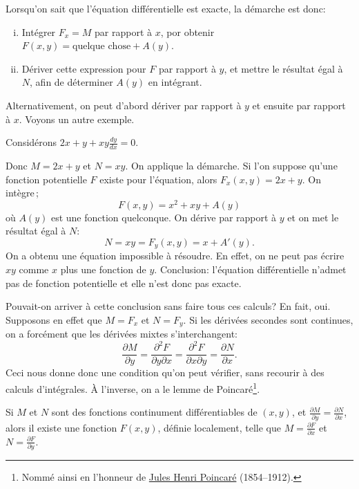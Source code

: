 Lorsqu'on sait que l'équation différentielle est exacte, la démarche est donc:
\begin{enumerate}[(i)]
	\item Intégrer $F_x = M$ par rapport à $x$, por obtenir $F(x,y) = \text{quelque chose} + A(y)$.
	\item Dériver cette expression pour $F$ par rapport à $y$, et mettre le résultat égal à
			$N$, afin de déterminer $A(y)$ en intégrant.
\end{enumerate}
Alternativement, on peut d'abord dériver par rapport à $y$ et ensuite par rapport à $x$.
Voyons un autre exemple.

\begin{example}
	Considérons $2x+y + xy \frac{dy}{dx} = 0$.

	Donc $M = 2x+y$ et $N=xy$.  On applique la démarche.
	Si l'on suppose qu'une fonction potentielle $F$ existe pour l'équation, alors $F_x (x,y) = 2x+y$.
	On intègre\,;
	\begin{equation*}
		F(x,y) = x^2 + xy + A(y)
	\end{equation*}
	où $A(y)$ est une fonction quelconque. On dérive par rapport à $y$ et on met le résultat égal à $N$:
	\begin{equation*}
		N = xy = F_y (x,y) = x+A'(y) .
	\end{equation*}
	On a obtenu une équation impossible à résoudre.  En effet, on ne peut pas écrire $xy$ comme
	$x$ plus une fonction de $y$.
	Conclusion: l'équation différentielle n'admet pas de fonction potentielle et elle n'est donc pas exacte.
\end{example}

Pouvait-on arriver à cette conclusion sans faire tous ces calculs?  En fait, oui.  Supposons en effet que
$M = F_x$ et
$N = F_y$.  Si les dérivées secondes sont continues, on a forcément que les dérivées mixtes s'interchangent:
\begin{equation*}
	\frac{\partial M}{\partial y}
		= 	\frac{\partial^2 F}{\partial y \partial x}
		=	\frac{\partial^2 F}{\partial x \partial y}
		= 	\frac{\partial N}{\partial x} .
\end{equation*}
Ceci nous donne donc une condition qu'on peut vérifier, sans recourir à des calculs d'intégrales.
À l'inverse, on a le lemme de Poincaré\footnote{Nommé ainsi en l'honneur de
\href{https://en.wikipedia.org/wiki/Henri_Poincar\%C3\%A9}{Jules Henri
Poincaré} (1854--1912).}.

\begin{theorem}[Poincaré]
Si $M$ et $N$ sont des fonctions continument différentiables de $(x,y)$, et
$\frac{\partial M}{\partial y} = \frac{\partial N}{\partial x}$,
alors il existe une fonction $F(x,y)$, définie localement, telle que $M = \frac{\partial F}{\partial x}$ et
$N = \frac{\partial F}{\partial y}$.
\end{theorem}

